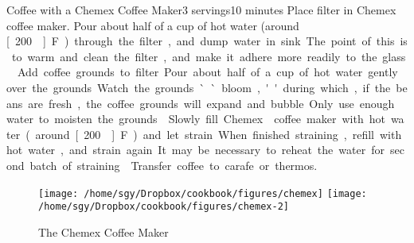 \begin{recipe}{Coffee with a Chemex\textsuperscript{\texttrademark} Coffee Maker}{3 servings}{10 minutes}
Place filter in Chemex\textsuperscript{\texttrademark} coffee maker.  Pour about half of a cup of hot water (around \unit[200\0]{F}) through the filter, and dump water in sink.  The point of this is to warm and clean the filter, and make it adhere more readily to the glass.
Add coffee grounds to filter.  Pour about half of a cup of hot water gently over the grounds.  Watch the grounds ``bloom,'' during which, if the beans are fresh, the coffee grounds will expand and bubble.  Only use enough water to moisten the grounds.
\newstep
Slowly fill Chemex\textsuperscript{\texttrademark} coffee maker with hot water (around \unit[200\0]{F}) and let strain.  When finished straining, refill with hot water, and strain again.  It may be necessary to reheat the water for second batch of straining.
\newstep
Transfer coffee to carafe or thermos.
\end{recipe}
\begin{figure}[b!]
\begin{center}
\texttt{[image: /home/sgy/Dropbox/cookbook/figures/chemex]}
\hspace{0.1\textwidth}
\texttt{[image: /home/sgy/Dropbox/cookbook/figures/chemex-2]}
\end{center}
\caption*{The Chemex\tm{} Coffee Maker}
\end{figure}
